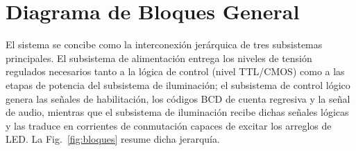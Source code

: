 \documentclass[10pt,onecolumn]{IEEEtran}
\begin{document}

\section{Diagrama de Bloques General}
\label{sec:bloques}

El sistema se concibe como la interconexión jerárquica de tres subsistemas principales. El subsistema de alimentación entrega los niveles de tensión regulados necesarios tanto a la lógica de control (nivel TTL/CMOS) como a las etapas de potencia del subsistema de iluminación; el subsistema de control lógico genera las señales de habilitación, los códigos BCD de cuenta regresiva y la señal de audio, mientras que el subsistema de iluminación recibe dichas señales lógicas y las traduce en corrientes de conmutación capaces de excitar los arreglos de LED. La Fig.~\ref{fig:bloques} resume dicha jerarquía.
\end{document}
